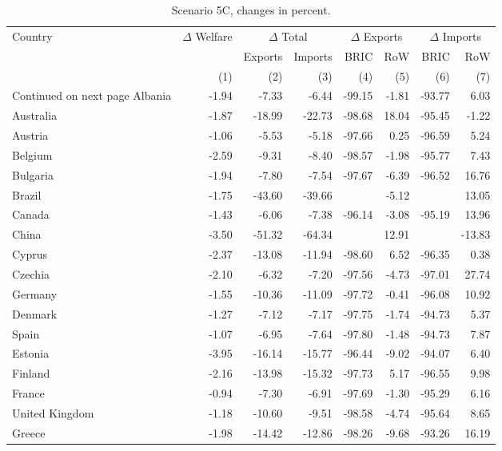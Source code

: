 \begin{longtable}{lrrrrrrr}
\caption{\label{tab:scen-5c}Scenario 5C, changes in percent.} \\ 
  \hline
  Country & $\Delta$ Welfare & \multicolumn{2}{c}{$\Delta$ Total} & \multicolumn{2}{c}{$\Delta$ Exports} & \multicolumn{2}{c}{$\Delta$ Imports} \\
&&Exports&Imports&BRIC&RoW&BRIC&RoW}\\\cmidrule{2-8}
&(1)&(2)&(3)&(4)&(5)&(6)&(7)} \\
\endhead
\hline
{\footnotesize Continued on next page}
\endfoot
\endlastfoot
 \hline
Albania & -1.94 & -7.33 & -6.44 & -99.15 & -1.81 & -93.77 & 6.03 \\ 
  Australia & -1.87 & -18.99 & -22.73 & -98.68 & 18.04 & -95.45 & -1.22 \\ 
  Austria & -1.06 & -5.53 & -5.18 & -97.66 & 0.25 & -96.59 & 5.24 \\ 
  Belgium & -2.59 & -9.31 & -8.40 & -98.57 & -1.98 & -95.77 & 7.43 \\ 
  Bulgaria & -1.94 & -7.80 & -7.54 & -97.67 & -6.39 & -96.52 & 16.76 \\ 
  Brazil & -1.75 & -43.60 & -39.66 &  & -5.12 &  & 13.05 \\ 
  Canada & -1.43 & -6.06 & -7.38 & -96.14 & -3.08 & -95.19 & 13.96 \\ 
  China & -3.50 & -51.32 & -64.34 &  & 12.91 &  & -13.83 \\ 
  Cyprus & -2.37 & -13.08 & -11.94 & -98.60 & 6.52 & -96.35 & 0.38 \\ 
  Czechia & -2.10 & -6.32 & -7.20 & -97.56 & -4.73 & -97.01 & 27.74 \\ 
  Germany & -1.55 & -10.36 & -11.09 & -97.72 & -0.41 & -96.08 & 10.92 \\ 
  Denmark & -1.27 & -7.12 & -7.17 & -97.75 & -1.74 & -94.73 & 5.37 \\ 
  Spain & -1.07 & -6.95 & -7.64 & -97.80 & -1.48 & -94.73 & 7.87 \\ 
  Estonia & -3.95 & -16.14 & -15.77 & -96.44 & -9.02 & -94.07 & 6.40 \\ 
  Finland & -2.16 & -13.98 & -15.32 & -97.73 & 5.17 & -96.55 & 9.98 \\ 
  France & -0.94 & -7.30 & -6.91 & -97.69 & -1.30 & -95.29 & 6.16 \\ 
  United Kingdom & -1.18 & -10.60 & -9.51 & -98.58 & -4.74 & -95.64 & 8.65 \\ 
  Greece & -1.98 & -14.42 & -12.86 & -98.26 & -9.68 & -93.26 & 16.19 \\ 

\end{longtable}
